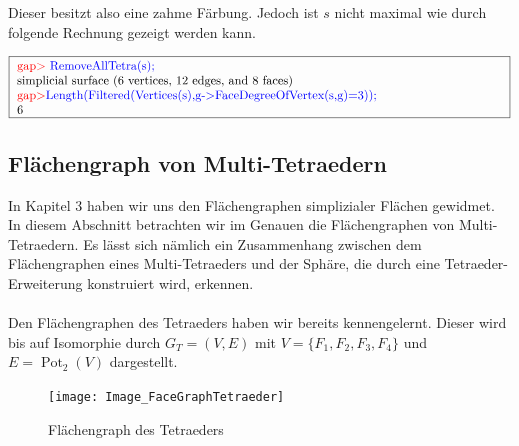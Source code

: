 \documentclass[12pt,titlepage,twoside,cleardoublepage]{article}
\theoremstyle{nummermitklammern}
\numberwithin{equation}{section}
\DeclareMathOperator{\Pot}{Pot}
\begin{document}
Dieser besitzt also eine zahme Färbung. Jedoch ist $s$ nicht maximal wie durch folgende Rechnung gezeigt werden kann.
\begin{center}
$\fbox{
\parbox{14cm}{
\textcolor{red}{gap$>$} \textcolor{blue}{RemoveAllTetra(s);}\newline
simplicial surface (6 vertices, 12 edges, and 8 faces)\newline
\textcolor{red}{gap$>$}\textcolor{blue}{ Length(Filtered(Vertices(s),g-$>$FaceDegreeOfVertex(s,g)=3));}\newline
6
}}$
\end{center}
\subsection{Flächengraph von Multi-Tetraedern}
In Kapitel 3 haben wir uns den Flächengraphen simplizialer Flächen gewidmet. In diesem Abschnitt betrachten wir im Genauen die Flächengraphen von Multi-Tetraedern. Es lässt sich nämlich ein Zusammenhang zwischen dem Flächengraphen eines Multi-Tetraeders und der Sphäre, die durch eine Tetraeder-Erweiterung konstruiert wird, erkennen.\\\\
Den Flächengraphen des Tetraeders haben wir bereits kennengelernt. Dieser wird bis auf Isomorphie durch $G_T=(V,E)$ mit $V=\{F_1,F_2,F_3,F_4\}$ und $E=\Pot_2(V)$ dargestellt.
\begin{figure}[H]
\begin{center}
\texttt{[image: Image\_FaceGraphTetraeder]}
\end{center}
\caption{Flächengraph des Tetraeders}
\end{figure}
\end{document}
